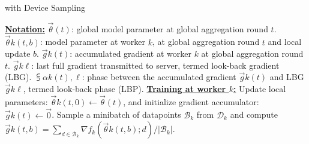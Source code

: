 \begin{algorithm}[h!]
{\footnotesize 
  \caption{{\algName} with Device Sampling}
\label{alg:sampling}
\begin{algorithmic}[1]
    \Statex \textbf{\underline{Notation:}}
    \Statex $\vec{\theta}{}{(t)}$: global model parameter at global aggregation round $t$.
    \Statex $\vec{\theta}{k}{(t, b)}$: model parameter at worker $k$, at global aggregation round $t$ and local update $b$.
    \Statex $\vec{g}{k}{(t)}$: accumulated gradient at worker $k$ at global aggregation round $t$.
    \Statex $\vec{g}{k}{\ell}$: last full gradient transmitted to server, termed look-back gradient (LBG).
    \Statex $\subsup{\alpha}{k}{(t), \ell}$: phase between the accumulated gradient $\vec{g}{k}{(t)}$ and LBG $\vec{g}{k}{\ell}$, termed look-back phase (LBP).
    \Statex \textbf{\underline{Training at worker $k$:}}
    \State Update local parameters: $\vec{\theta}{k}{(t, 0)} \leftarrow \vec{\theta}{}{(t)}$, and initialize gradient accumulator: $\vec{g}{k}{(t)} \leftarrow \vec{0}{}{}$.
        \State Sample a minibatch of  datapoints $\mathcal{B}_k$ from  $\mathcal{D}_{k}$ and compute $\vec{g}{k}{(t, b)}= \sum_{d\in \mathcal{B}_k} \nabla f_k(\vec{\theta}{k}{(t, b)};d)/|\mathcal{B}_k|$.
        

\end{algorithmic}}
\end{algorithm}
